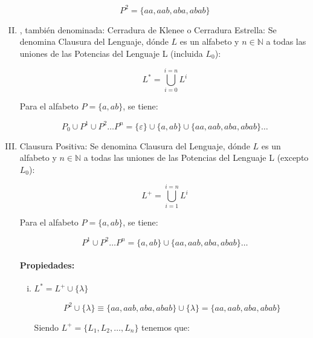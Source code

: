 \begin{enumerate}[I.]
{\begin{equation}
P^2 = \{aa,aab,aba,abab\}
\end{equation}


}\item {}, también denominada: Cerradura de Klenee o Cerradura Estrella: Se denomina Clausura del Lenguaje, dónde $L$ es 
un  alfabeto y $n \in \mathbb{N}$ a todas las uniones de las Potencias del Lenguaje L (incluida $L_0$): {

\begin{equation}
L^* = \bigcup_{i = 0}^{i = n}{L^i}
\end{equation}

\ejem Para el alfabeto $P = \{a,ab\}$, se tiene:

\begin{equation}
P_0 \cup P^1 \cup P^2 \dots P^n = \{\varepsilon\} \cup \{a,ab\} \cup \{aa,aab,aba,abab\} \dots
\end{equation}

}\item {}Clausura Positiva: Se denomina Clausura del Lenguaje, dónde $L$ es 
un  alfabeto y $n \in \mathbb{N}$ a todas las uniones de las Potencias del Lenguaje L (excepto $L_0$): {

\begin{equation}
L^+ = \bigcup_{i = 1}^{i = n}{L^i}
\end{equation}

\ejem Para el alfabeto $P = \{a,ab\}$, se tiene:

\begin{equation}
P^1 \cup P^2 \dots P^n = \{a,ab\} \cup \{aa,aab,aba,abab\} \dots
\end{equation}


\paragraph*{Propiedades:}

\begin{enumerate}[i.]

\item $L^* = L^+ \cup \{\lambda\}$
{
\begin{equation}
P^2 \cup \{\lambda\} \equiv \{aa,aab, aba, abab\} \cup \{\lambda\} = 
\{aa,aab,aba, abab\}
\end{equation}

\dhm Siendo $L^+= \{L_1, L_2, \ldots, L_n\}$ tenemos que:

}
\end{enumerate}}
\end{enumerate}
